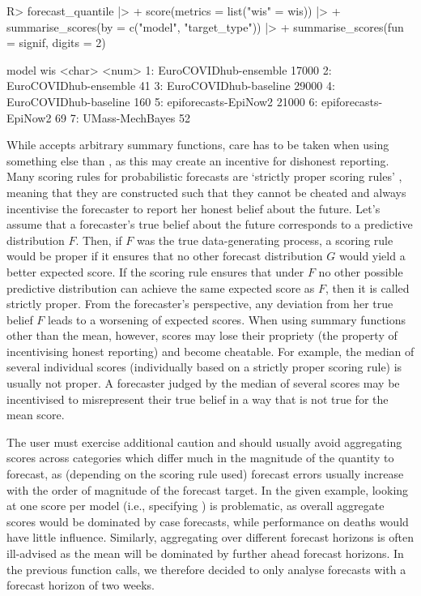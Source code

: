 \documentclass[
]{jss}
\begin{document}
\begin{CodeChunk}
\begin{CodeInput}
R> forecast_quantile |>
+   score(metrics = list("wis" = wis)) |>
+   summarise_scores(by = c("model", "target_type")) |>
+   summarise_scores(fun = signif, digits = 2)
\end{CodeInput}
\begin{CodeOutput}
                   model   wis
                  <char> <num>
1: EuroCOVIDhub-ensemble 17000
2: EuroCOVIDhub-ensemble    41
3: EuroCOVIDhub-baseline 29000
4: EuroCOVIDhub-baseline   160
5:  epiforecasts-EpiNow2 21000
6:  epiforecasts-EpiNow2    69
7:       UMass-MechBayes    52
\end{CodeOutput}
\end{CodeChunk}

While  accepts arbitrary summary functions,
care has to be taken when using something else than , as
this may create an incentive for dishonest reporting. Many scoring rules
for probabilistic forecasts are `strictly proper scoring rules'
\citep{gneitingStrictlyProperScoring2007}, meaning that they are
constructed such that they cannot be cheated and always incentivise the
forecaster to report her honest belief about the future. Let's assume
that a forecaster's true belief about the future corresponds to a
predictive distribution \(F\). Then, if \(F\) was the true
data-generating process, a scoring rule would be proper if it ensures
that no other forecast distribution \(G\) would yield a better expected
score. If the scoring rule ensures that under \(F\) no other possible
predictive distribution can achieve the same expected score as \(F\),
then it is called strictly proper. From the forecaster's perspective,
any deviation from her true belief \(F\) leads to a worsening of
expected scores. When using summary functions other than the mean,
however, scores may lose their propriety (the property of incentivising
honest reporting) and become cheatable. For example, the median of
several individual scores (individually based on a strictly proper
scoring rule) is usually not proper. A forecaster judged by the median
of several scores may be incentivised to misrepresent their true belief
in a way that is not true for the mean score.

The user must exercise additional caution and should usually avoid
aggregating scores across categories which differ much in the magnitude
of the quantity to forecast, as (depending on the scoring rule used)
forecast errors usually increase with the order of magnitude of the
forecast target. In the given example, looking at one score per model
(i.e., specifying ) is problematic, as overall
aggregate scores would be dominated by case forecasts, while performance
on deaths would have little influence. Similarly, aggregating over
different forecast horizons is often ill-advised as the mean will be
dominated by further ahead forecast horizons. In the previous function
calls, we therefore decided to only analyse forecasts with a forecast
horizon of two weeks.
\end{document}
